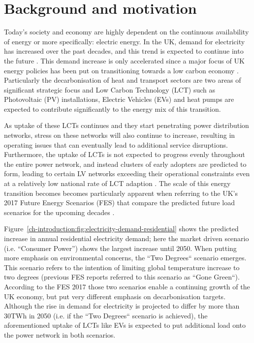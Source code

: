 \section{Background and motivation}
\label{ch-introduction:sec:background}

Today's society and economy are highly dependent on the continuous availability of energy or more specifically: electric energy.
In the UK, demand for electricity has increased over the past decades, and this trend is expected to continue into the future \cite{HMGovernment2009}.
This demand increase is only accelerated since a major focus of UK energy policies has been put on transitioning towards a low carbon economy \cite{RoyalAcademyofEngineering2010}.
Particularly the decarbonisation of heat and transport sectors are two areas of significant strategic focus and Low Carbon Technology (LCT) such as Photovoltaic (PV) installations, Electric Vehicles (EVs) and heat pumps are expected to contribute significantly to the energy mix of this transition.


As uptake of these LCTs continues and they start penetrating power distribution networks, stress on these networks will also continue to increase, resulting in operating issues that can eventually lead to additional service disruptions.
Furthermore, the uptake of LCTs is not expected to progress evenly throughout the entire power network, and instead clusters of early adopters are predicted to form, leading to certain LV networks exceeding their operational constraints even at a relatively low national rate of LCT adaption \cite{Poghosyan2014}.
The scale of this energy transition becomes becomes particularly apparent when referring to the UK's 2017 Future Energy Scenarios (FES) that compare the predicted future load scenarios for the upcoming decades \cite{FES2017}.



Figure~\ref{ch-introduction:fig:electricity-demand-residential} shows the predicted increase in annual residential electricity demand; here the market driven scenario (i.e. ``Consumer Power'') shows the largest increase until 2050.
When putting more emphasis on environmental concerns, the ``Two Degrees`` scenario emerges.
This scenario refers to the intention of limiting global temperature increase to two degrees (previous FES reports referred to this scenario as ``Gone Green``).
According to the FES 2017 those two scenarios enable a continuing growth of the UK economy, but put very different emphasis on decarbonisation targets.
Although the rise in demand for electricity is projected to differ by more than 30TWh in 2050 (i.e. if the ``Two Degrees`` scenario is achieved), the aforementioned uptake of LCTs like EVs is expected to put additional load onto the power network in both scenarios.

